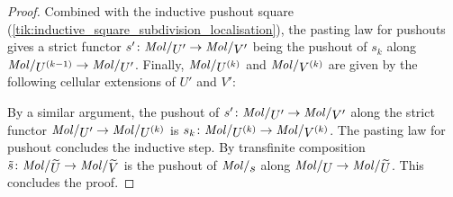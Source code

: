 \begin{proof}
    Combined with the inductive pushout square (\ref{tik:inductive_square_subdivision_localisation}), the pasting law for pushouts gives a strict functor \( s' \colon \molecin{U'} \to \molecin{V'} \) being the pushout of \( s_k \) along \( \molecin{\order{k - 1}{U}} \to \molecin{U'} \).
    Finally, \( \molecin{\order k U} \) and \(  {\molecin{\order k V}} \) are given by the following cellular extensions of \( U' \) and \( V' \):
    \begin{center}
    \end{center}
    By a similar argument, the pushout of \( s' \colon  \molecin{U'} \to \molecin{V'} \) along the strict functor \( \molecin{U'} \to \molecin{\order{k}{U}} \) is \( s_k \colon \molecin{\order{k}{U}} \to \molecin{\order{k}{V}} \).
    The pasting law for pushout concludes the inductive step.
    By transfinite composition \( \tilde{s} \colon \molecin{\selfloc{U}} \to \molecin{\selfloc{V}} \) is the pushout of \( \molecin{s} \) along \( \molecin{U} \to \molecin{\selfloc U} \).
    This concludes the proof.
\end{proof}

